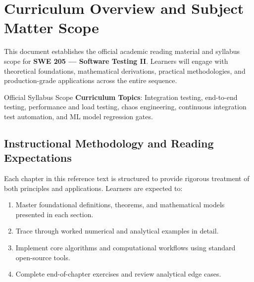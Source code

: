 \section{Curriculum Overview and Subject Matter Scope}

This document establishes the official academic reading material and syllabus scope for \textbf{SWE 205 --- Software Testing II}. Learners will engage with theoretical foundations, mathematical derivations, practical methodologies, and production-grade applications across the entire sequence.

\begin{InsightBox}{Official Syllabus Scope}
  \textbf{Curriculum Topics}: Integration testing, end-to-end testing, performance and load testing, chaos engineering, continuous integration test automation, and ML model regression gates.
\end{InsightBox}

\subsection{Instructional Methodology and Reading Expectations}

Each chapter in this reference text is structured to provide rigorous treatment of both principles and applications. Learners are expected to:
\begin{enumerate}
  \item Master foundational definitions, theorems, and mathematical models presented in each section.
  \item Trace through worked numerical and analytical examples in detail.
  \item Implement core algorithms and computational workflows using standard open-source tools.
  \item Complete end-of-chapter exercises and review analytical edge cases.
\end{enumerate}

